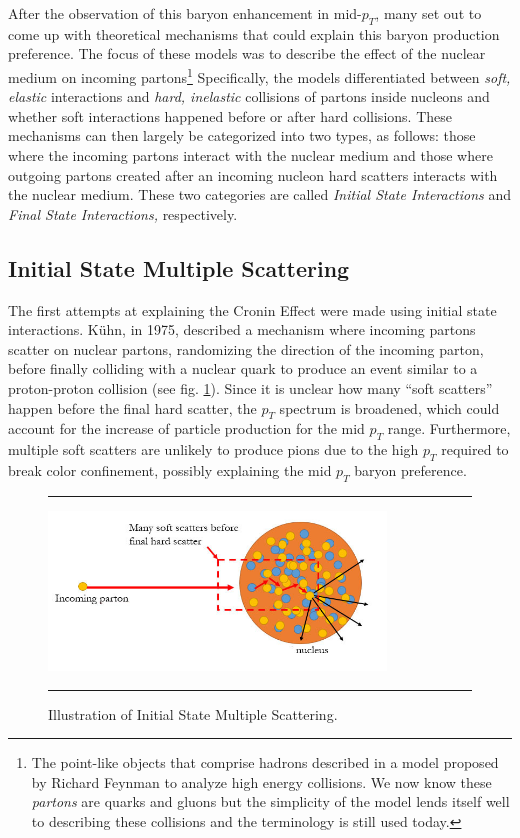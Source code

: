 After the observation of this baryon enhancement in mid-$p_T$, many set out to come up with theoretical mechanisms that could explain this baryon production preference. The focus of these models was to describe the effect of the nuclear medium on incoming partons\footnote{The point-like objects that comprise hadrons described in a model proposed by Richard Feynman to analyze high energy collisions. We now know these \textit{partons} are quarks and gluons but the simplicity of the model lends itself well to describing these collisions and the terminology is still used today.} Specifically, the models differentiated between \textit{soft, elastic} interactions and \textit{hard, inelastic} collisions of partons inside nucleons and whether soft interactions happened before or after hard collisions. These mechanisms can then largely be categorized into two types, as follows: those where the incoming partons interact with the nuclear medium and those where outgoing partons created after an incoming nucleon hard scatters interacts with the nuclear medium. These two categories are called \textit{Initial State Interactions} and \textit{Final State Interactions,} respectively.

\subsection{Initial State Multiple Scattering}
The first attempts at explaining the Cronin Effect were made using initial state interactions. K\"{u}hn, in 1975, described a mechanism where incoming partons scatter on nuclear partons, randomizing the direction of the incoming parton, before finally colliding with a nuclear quark to produce an event similar to a proton-proton collision\citep{PhysRevD.13.2948} (see fig. \ref{fig:ISIscattering}). Since it is unclear how many ``soft scatters'' happen before the final hard scatter, the $p_{T}$ spectrum is broadened, which could account for the increase of particle production for the mid $p_{T}$ range. Furthermore, multiple soft scatters are unlikely to produce pions due to the high $p_T$ required to break color confinement, possibly explaining the mid $p_T$ baryon preference.
\begin{figure}[htbp!]
  \centering    \rule{35em}{0.5pt}
    \includegraphics[width=0.8\textwidth]{Figures/ISIscattering.jpg}

  \caption[Illustration of Initial State Multiple Scattering]{Illustration of Initial State Multiple Scattering.}
  \label{fig:ISIscattering}    \rule{35em}{0.5pt}
\end{figure} 

